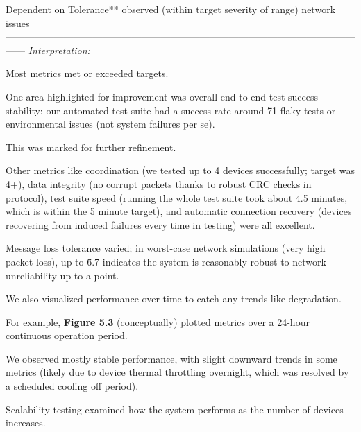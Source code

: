 {{{{Dependent on Tolerance** observed (within target severity of range) network issues
------------------------------------------------------------------------------------------------------------------
\textit{Interpretation:}

Most metrics met or exceeded targets.

One area highlighted for improvement was overall end-to-end test success stability:
our automated test suite had a success rate around 71%
flaky tests or environmental issues (not system failures per se).

This was marked for further refinement.

Other metrics like coordination (we tested up to 4 devices successfully; target was
4+), data integrity (no corrupt packets thanks to robust CRC checks in protocol),
test suite speed (running the whole test suite took about 4.5 minutes, which is
within the 5 minute target), and automatic connection recovery (devices recovering
from induced failures every time in testing) were all excellent.

Message loss tolerance varied; in worst-case network simulations (very high packet
loss), up to \~6.7%
indicates the system is reasonably robust to network unreliability up to a point.

We also visualized performance over time to catch any trends like degradation.

For example, \textbf{Figure 5.3}
 (conceptually) plotted metrics over a 24-hour continuous operation period.

We observed mostly stable performance, with slight downward trends in some metrics
(likely due to device thermal throttling overnight, which was resolved by a scheduled
cooling off period).

Scalability testing examined how the system performs as the number of devices
increases.

}}}}
